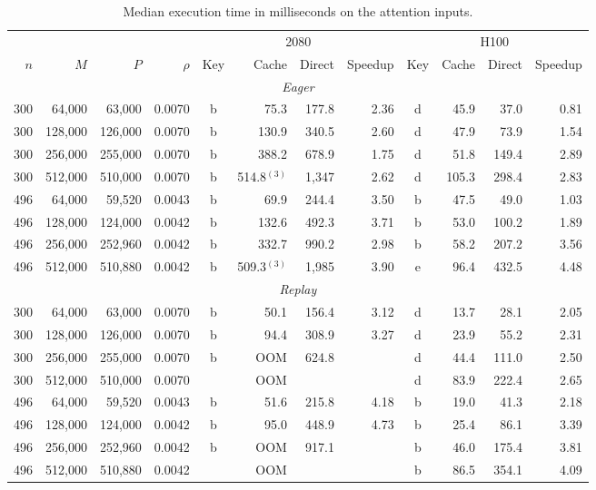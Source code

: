 \begin{table}[!htbp]
\caption{Median execution time in milliseconds on the attention inputs.}
\label{tab:main_attention}
\footnotesize
\setlength{\tabcolsep}{2.5pt}
\begin{tabular}{rrrr crrr crrr}
\toprule
 &  &  &  & \multicolumn{4}{c}{2080} & \multicolumn{4}{c}{H100} \\
\cmidrule(lr){5-8} \cmidrule(lr){9-12}
$n$ & $M$ & $P$ & $\rho$ & Key & Cache & Direct & Speedup & Key & Cache & Direct & Speedup \\
\midrule
\multicolumn{12}{c}{\textit{Eager}} \\
300 & 64,000 & 63,000 & 0.0070 & b & 75.3 & 177.8 & 2.36 & d & 45.9 & 37.0 & 0.81 \\
300 & 128,000 & 126,000 & 0.0070 & b & 130.9 & 340.5 & 2.60 & d & 47.9 & 73.9 & 1.54 \\
300 & 256,000 & 255,000 & 0.0070 & b & 388.2 & 678.9 & 1.75 & d & 51.8 & 149.4 & 2.89 \\
300 & 512,000 & 510,000 & 0.0070 & b & 514.8$^{(3)}$ & 1,347 & 2.62 & d & 105.3 & 298.4 & 2.83 \\
496 & 64,000 & 59,520 & 0.0043 & b & 69.9 & 244.4 & 3.50 & b & 47.5 & 49.0 & 1.03 \\
496 & 128,000 & 124,000 & 0.0042 & b & 132.6 & 492.3 & 3.71 & b & 53.0 & 100.2 & 1.89 \\
496 & 256,000 & 252,960 & 0.0042 & b & 332.7 & 990.2 & 2.98 & b & 58.2 & 207.2 & 3.56 \\
496 & 512,000 & 510,880 & 0.0042 & b & 509.3$^{(3)}$ & 1,985 & 3.90 & e & 96.4 & 432.5 & 4.48 \\
\midrule
\multicolumn{12}{c}{\textit{Replay}} \\
300 & 64,000 & 63,000 & 0.0070 & b & 50.1 & 156.4 & 3.12 & d & 13.7 & 28.1 & 2.05 \\
300 & 128,000 & 126,000 & 0.0070 & b & 94.4 & 308.9 & 3.27 & d & 23.9 & 55.2 & 2.31 \\
300 & 256,000 & 255,000 & 0.0070 & b & OOM & 624.8 &  & d & 44.4 & 111.0 & 2.50 \\
300 & 512,000 & 510,000 & 0.0070 &  & OOM &  &  & d & 83.9 & 222.4 & 2.65 \\
496 & 64,000 & 59,520 & 0.0043 & b & 51.6 & 215.8 & 4.18 & b & 19.0 & 41.3 & 2.18 \\
496 & 128,000 & 124,000 & 0.0042 & b & 95.0 & 448.9 & 4.73 & b & 25.4 & 86.1 & 3.39 \\
496 & 256,000 & 252,960 & 0.0042 & b & OOM & 917.1 &  & b & 46.0 & 175.4 & 3.81 \\
496 & 512,000 & 510,880 & 0.0042 &  & OOM &  &  & b & 86.5 & 354.1 & 4.09 \\
\bottomrule
\end{tabular}
\end{table}